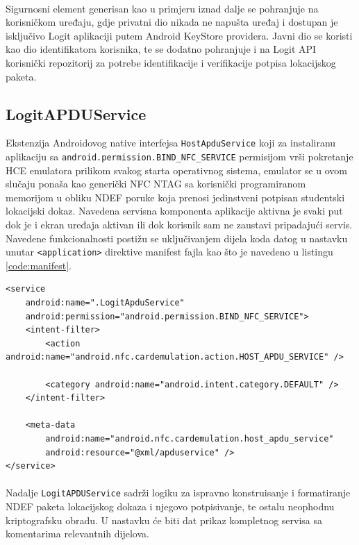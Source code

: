 \paragraph*{}
Sigurnosni element generisan kao u primjeru iznad dalje se pohranjuje na korisničkom uređaju, gdje privatni dio nikada ne napušta uređaj i dostupan je isključivo Logit aplikaciji putem Android KeyStore providera. Javni dio se koristi kao dio identifikatora korisnika, te se dodatno pohranjuje i na Logit API korisnički repozitorij za potrebe identifikacije i verifikacije potpisa lokacijskog paketa.

\subsection{LogitAPDUService}
Ekstenzija Androidovog native interfejsa \texttt{HostApduService} koji za instaliranu aplikaciju sa \texttt{android.permission.BIND\_NFC\_SERVICE} permisijom vrši pokretanje HCE emulatora prilikom svakog starta operativnog sistema, emulator se u ovom slučaju ponaša kao generički NFC NTAG sa korisnički programiranom memorijom u obliku NDEF poruke koja prenosi jedinstveni potpisan studentski lokacijski dokaz. Navedena servisna komponenta aplikacije aktivna je svaki put dok je i ekran uređaja aktivan ili dok korisnik sam ne zaustavi pripadajući servis. Navedene funkcionalnosti postižu se uključivanjem dijela koda datog u nastavku unutar \texttt{<application>} direktive manifest fajla kao što je navedeno u listingu \ref{code:manifest}.

\begin{code}
\begin{verbatim}
<service
    android:name=".LogitApduService"
    android:permission="android.permission.BIND_NFC_SERVICE">
    <intent-filter>
        <action android:name="android.nfc.cardemulation.action.HOST_APDU_SERVICE" />

        <category android:name="android.intent.category.DEFAULT" />
    </intent-filter>

    <meta-data
        android:name="android.nfc.cardemulation.host_apdu_service"
        android:resource="@xml/apduservice" />
</service>
\end{verbatim}
\label{code:manifest}
\end{code}

\paragraph*{}
Nadalje \texttt{LogitAPDUService} sadrži logiku za ispravno konstruisanje i formatiranje NDEF paketa\cite{tindef} lokacijskog dokaza i njegovo potpisivanje, te ostalu neophodnu kriptografsku obradu. U nastavku će biti dat prikaz kompletnog servisa sa komentarima relevantnih dijelova.

